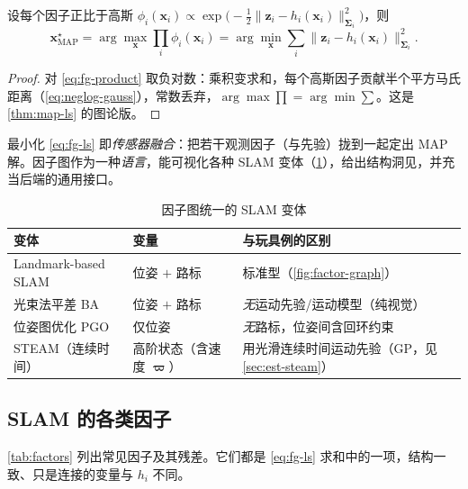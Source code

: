 \begin{theorem}[因子图上的 MAP $=$ 非线性最小二乘]\label{thm:fg-map}
设每个因子正比于高斯 $\phi_i(\mathbf{x}_i)\propto\exp\!\big(-\tfrac12\|\mathbf{z}_i-h_i(\mathbf{x}_i)\|_{\boldsymbol{\Sigma}_i}^2\big)$，则
\begin{equation}
  \mathbf{x}^\star_{\mathrm{MAP}}
  =\arg\max_{\mathbf{x}}\prod_i\phi_i(\mathbf{x}_i)
  =\arg\min_{\mathbf{x}}\sum_i\|\mathbf{z}_i-h_i(\mathbf{x}_i)\|_{\boldsymbol{\Sigma}_i}^2.
  \label{eq:fg-ls}
\end{equation}
\end{theorem}
\begin{proof}
对 \cref{eq:fg-product} 取负对数：乘积变求和，每个高斯因子贡献半个平方马氏距离（\cref{eq:neglog-gauss}），常数丢弃，$\arg\max\prod=\arg\min\sum$。这是 \cref{thm:map-ls} 的图论版。
\end{proof}
\noindent 最小化 \cref{eq:fg-ls} 即\emph{传感器融合}：把若干观测因子（与先验）拢到一起定出 MAP 解。因子图作为一种\emph{语言}，能可视化各种 SLAM 变体（\cref{tab:est-slam-variants}），给出结构洞见，并充当后端的通用接口。

\begin{table}[H]\centering\small
\caption{因子图统一的 SLAM 变体}
\label{tab:est-slam-variants}
\begin{tabular}{lll}
\toprule
变体 & 变量 & 与玩具例的区别 \\
\midrule
Landmark-based SLAM & 位姿 $+$ 路标 & 标准型（\cref{fig:factor-graph}） \\
光束法平差 BA & 位姿 $+$ 路标 & \emph{无}运动先验/运动模型（纯视觉） \\
位姿图优化 PGO & 仅位姿 & \emph{无}路标，位姿间含回环约束 \\
STEAM（连续时间） & 高阶状态（含速度 $\boldsymbol{\varpi}$） & 用光滑连续时间运动先验（GP，见 \cref{sec:est-steam}） \\
\bottomrule
\end{tabular}
\end{table}

\subsection{SLAM 的各类因子}
\label{sec:est-factors}

\cref{tab:factors} 列出常见因子及其残差。它们都是 \cref{eq:fg-ls} 求和中的一项，结构一致、只是连接的变量与 $h_i$ 不同。


